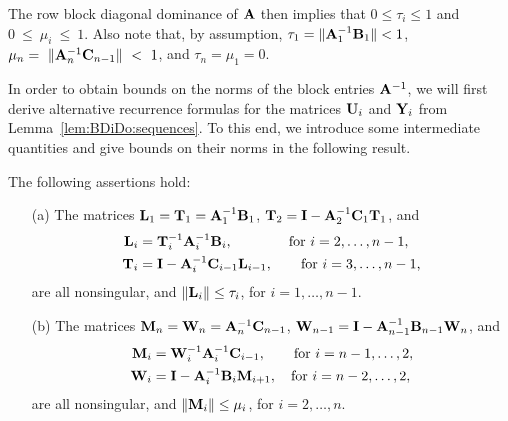 \noindent The row block diagonal dominance of $\mathbf{A}$ then implies that
$0\leq \tau_i\leq 1$ and $0~\leq~\mu_i~\leq~1$. Also note that, by
assumption, $\tau_1=\|\mathbf{A}_1^{-1}\mathbf{B}_1\|<1$, $\mu_n=~\|\mathbf{A}_n^{-1}\mathbf{C}_{n-1}\|~<~1$, and $\tau_n=\mu_1=0$.

In order to obtain bounds on the norms of the block entries $\mathbf{A}^{-1}$, we will
first derive alternative recurrence formulas for the matrices $\mathbf{U}_i$ and $\mathbf{Y}_i$
from Lemma~\ref{lem:BDiDo:sequences}. To this end, we introduce some intermediate
quantities and give bounds on their norms in the following result.

\begin{lemma}\label{lem:BDiDo:nonsing}
The following assertions hold:

\begin{itemize}
\item[(a)]
The matrices $\mathbf{L}_1=\mathbf{T}_1=\mathbf{A}^{-1}_1\mathbf{B}_1$, $\mathbf{T}_2=\mathbf{I}-\mathbf{A}_2^{-1}\mathbf{C}_1\mathbf{T}_1$, and
\begin{align*}
\mathbf{L}_i &= \mathbf{T}_i^{-1}\mathbf{A}_i^{-1}\mathbf{B}_{i}, \qquad\qquad \text{for $i=2,\dots,n-1$}, \\
\mathbf{T}_i &= \mathbf{I}-\mathbf{A}_i^{-1}\mathbf{C}_{i-1}\mathbf{L}_{i-1},\qquad  \text{for $i=3,\dots,n-1$,}
\end{align*}
are all nonsingular, and $\|\mathbf{L}_i\|\leq\tau_i$, for $i=1,\ldots,n-1$.

\item[(b)]
The matrices $\mathbf{M}_n=\mathbf{W}_n=\mathbf{A}^{-1}_{n}\mathbf{C}_{n-1}$, $\mathbf{W}_{n-1}=\mathbf{I}-\mathbf{A}^{-1}_{n-1}\mathbf{B}_{n-1}\mathbf{W}_{n}$, and
\begin{align*}
\M_i&= \W_{i}^{-1}\A_i^{-1}\C_{i-1},\quad\quad \text{for $i=n-1,\dots,2$},\\ %
\W_i&= \I-\A_{i}^{-1}\B_{i}\M_{i+1}, \quad\text{for $i=n-2,\dots,2$}, %
\end{align*}
are all nonsingular, and $\|\mathbf{M}_i\|\leq\mu_i$, for $i=2,\dots,n$.
\end{itemize}
\end{lemma}

